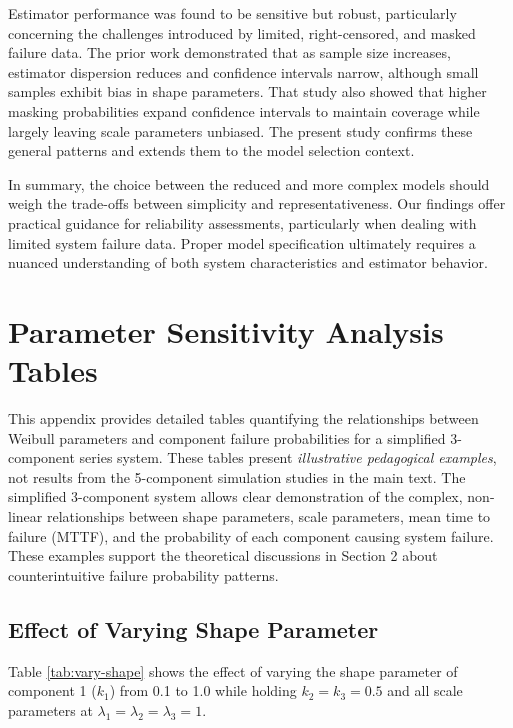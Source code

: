 \documentclass[11pt]{article}
\begin{document}
Estimator performance was found to be sensitive but robust, particularly concerning the challenges introduced by limited, right-censored, and masked failure data. The prior work \cite{towell2023reliability} demonstrated that as sample size increases, estimator dispersion reduces and confidence intervals narrow, although small samples exhibit bias in shape parameters. That study also showed that higher masking probabilities expand confidence intervals to maintain coverage while largely leaving scale parameters unbiased. The present study confirms these general patterns and extends them to the model selection context.

In summary, the choice between the reduced and more complex models should weigh the trade-offs between simplicity and representativeness. Our findings offer practical guidance for reliability assessments, particularly when dealing with limited system failure data. Proper model specification ultimately requires a nuanced understanding of both system characteristics and estimator behavior.

\appendix

\section{Parameter Sensitivity Analysis Tables}
\label{app:sensitivity-tables}

This appendix provides detailed tables quantifying the relationships between Weibull parameters and component failure probabilities for a simplified 3-component series system. These tables present \emph{illustrative pedagogical examples}, not results from the 5-component simulation studies in the main text. The simplified 3-component system allows clear demonstration of the complex, non-linear relationships between shape parameters, scale parameters, mean time to failure (MTTF), and the probability of each component causing system failure. These examples support the theoretical discussions in Section 2 about counterintuitive failure probability patterns.

\subsection{Effect of Varying Shape Parameter}

Table \ref{tab:vary-shape} shows the effect of varying the shape parameter of component 1 ($k_1$) from 0.1 to 1.0 while holding $k_2 = k_3 = 0.5$ and all scale parameters at $\lambda_1 = \lambda_2 = \lambda_3 = 1$.
\end{document}
